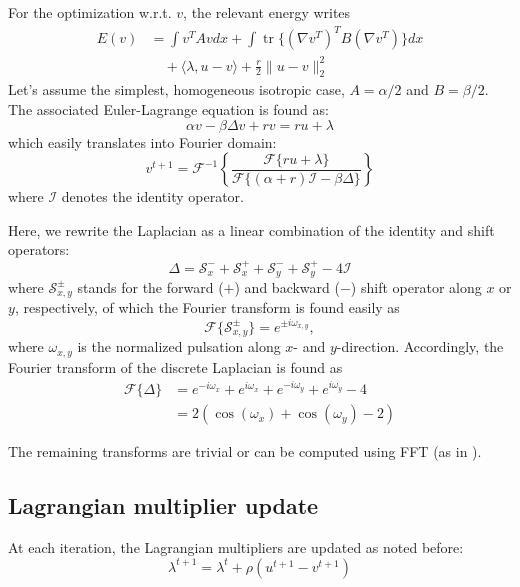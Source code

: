 \documentclass[a4paper,12pt]{article}
\DeclareMathOperator{\tr}{tr}
\begin{document}
For the optimization w.r.t. $v$, the relevant energy writes
\begin{align}
E(v) &= \int v^T A v dx + \int \tr\{(\nabla v^T)^T B (\nabla v^T)\} dx\\
&\quad + \langle \lambda, u-v \rangle + \frac{r}{2} \| u - v \|_2^2\nonumber
\end{align}
Let's assume the simplest, homogeneous isotropic case, $A = \alpha/2$ and $B = \beta/2$. The associated Euler-Lagrange equation is found as:
\begin{equation}
\alpha v - \beta\Delta v + rv = ru + \lambda
\end{equation}
which easily translates into Fourier domain:
\begin{equation}
v^{t+1} = \mathcal{F}^{-1}\left\{ \frac{\mathcal{F}\{ru + \lambda\}}{\mathcal{F}\{(\alpha+r)\mathcal{I}-\beta\Delta\}} \right\}
\end{equation}
where $\mathcal{I}$ denotes the identity operator.

Here, we rewrite the Laplacian as a linear combination of the identity and shift operators:
\begin{equation}
\Delta = \mathcal{S}_x^- + \mathcal{S}_x^+ + \mathcal{S}_y^- + \mathcal{S}_y^+ - 4 \mathcal{I}
\end{equation}
where $\mathcal{S}_{x,y}^{\pm}$ stands for the forward ($+$) and backward ($-$) shift operator along $x$ or $y$, respectively, of which the Fourier transform is found easily as
\begin{equation}
\mathcal{F}\{\mathcal{S}_{x,y}^{\pm}\} = e^{\pm i\omega_{x,y}},
\end{equation}
where $\omega_{x,y}$ is the normalized pulsation along $x$- and $y$-direction. Accordingly, the Fourier transform of the discrete Laplacian is found as
\begin{align}
\mathcal{F}\{\Delta\} &= e^{-i\omega_x } + e^{i\omega_x } + e^{-i\omega_y } + e^{i\omega_y } - 4\nonumber\\
&= 2\left( \cos(\omega_x) + \cos(\omega_y) - 2 \right)
\end{align}

The remaining transforms are trivial or can be computed using FFT (as in \cite{Estellers2011b}).


\subsection{Lagrangian multiplier update}
At each iteration, the Lagrangian multipliers are updated as noted before:
\begin{equation}
\lambda^{t+1} = \lambda^t + \rho(u^{t+1}-v^{t+1})
\end{equation}
\end{document}
